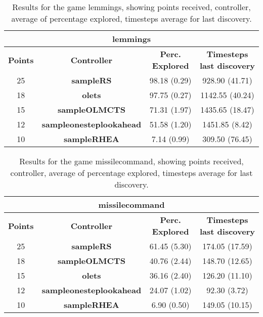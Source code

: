 \begin{table*}[!t]
\begin{center}
\begin{tabular}{|c|c|c|c|}
\multicolumn{4}{c}{\textbf{lemmings}}\\
\hline
\textbf{Points} & \textbf{Controller} & \textbf{Perc. Explored} &  \textbf{Timesteps last discovery}\\
\hline
25 & \textbf{sampleRS} & 98.18 (0.29) & 928.90 (41.71)
 \\
\hline
18 & \textbf{olets} & 97.75 (0.27) & 1142.55 (40.24)
 \\
\hline
15 & \textbf{sampleOLMCTS} & 71.31 (1.97) & 1435.65 (18.47)
 \\
\hline
12 & \textbf{sampleonesteplookahead} & 51.58 (1.20) & 1451.85 (8.42)
 \\
\hline
10 & \textbf{sampleRHEA} & 7.14 (0.99) & 309.50 (76.45)
 \\
\hline
\end{tabular}
\caption{Results for the game lemmings, showing points received, controller, average of percentage explored, timesteps average for last discovery.}
\label{tab:weights}
\end{center}
\end{table*}
\begin{table*}[!t]
\begin{center}
\begin{tabular}{|c|c|c|c|}
\multicolumn{4}{c}{\textbf{missilecommand}}\\
\hline
\textbf{Points} & \textbf{Controller} & \textbf{Perc. Explored} &  \textbf{Timesteps last discovery}\\
\hline
25 & \textbf{sampleRS} & 61.45 (5.30) & 174.05 (17.59)
 \\
\hline
18 & \textbf{sampleOLMCTS} & 40.76 (2.44) & 148.70 (12.65)
 \\
\hline
15 & \textbf{olets} & 36.16 (2.40) & 126.20 (11.10)
 \\
\hline
12 & \textbf{sampleonesteplookahead} & 24.07 (1.02) & 92.30 (3.72)
 \\
\hline
10 & \textbf{sampleRHEA} & 6.90 (0.50) & 149.05 (10.15)
 \\
\hline
\end{tabular}
\caption{Results for the game missilecommand, showing points received, controller, average of percentage explored, timesteps average for last discovery.}
\label{tab:weights}
\end{center}
\end{table*}
